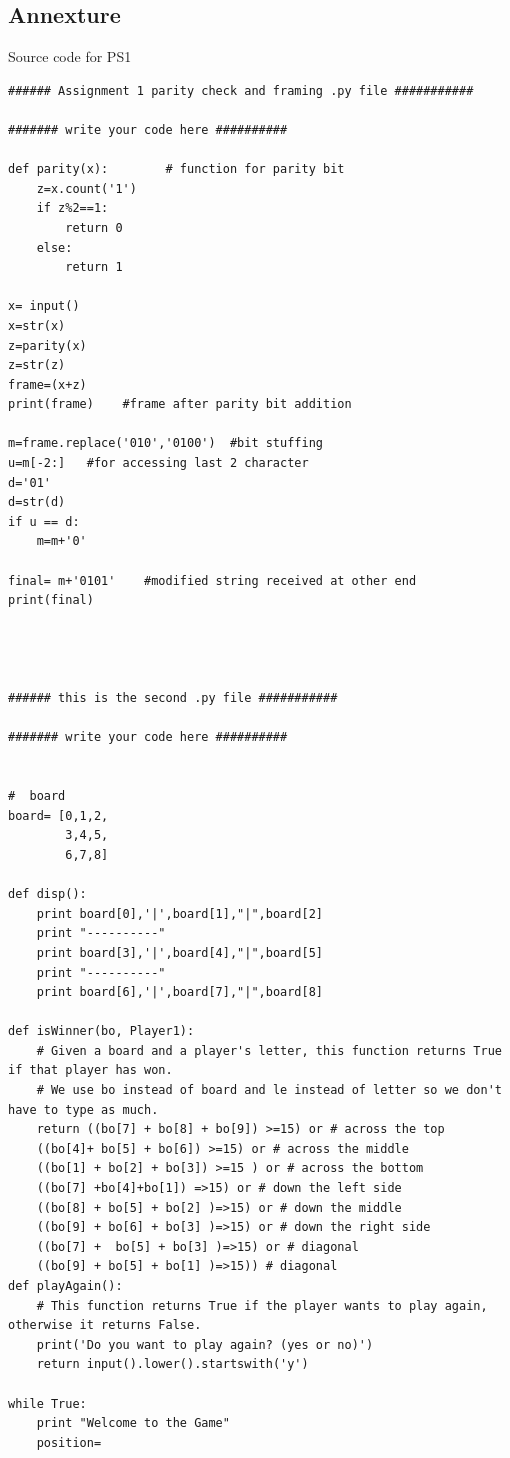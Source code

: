\documentclass[12pt]{article}
\begin{document}
\subsection* {Annexture}
Source code for PS1
\begin{lstlisting}
###### Assignment 1 parity check and framing .py file ###########

####### write your code here ##########

def parity(x):        # function for parity bit
	z=x.count('1')
	if z%2==1:
		return 0
	else:
		return 1

x= input()
x=str(x)
z=parity(x)
z=str(z)
frame=(x+z)
print(frame)    #frame after parity bit addition

m=frame.replace('010','0100')  #bit stuffing
u=m[-2:]   #for accessing last 2 character
d='01'
d=str(d)
if u == d:
	m=m+'0'

final= m+'0101'    #modified string received at other end  
print(final)

	


###### this is the second .py file ###########

####### write your code here ##########


#  board
board= [0,1,2,
        3,4,5,
        6,7,8]

def disp():
	print board[0],'|',board[1],"|",board[2]
	print "----------"
	print board[3],'|',board[4],"|",board[5]
	print "----------"
	print board[6],'|',board[7],"|",board[8]

def isWinner(bo, Player1):
    # Given a board and a player's letter, this function returns True if that player has won.
    # We use bo instead of board and le instead of letter so we don't have to type as much.
    return ((bo[7] + bo[8] + bo[9]) >=15) or # across the top
    ((bo[4]+ bo[5] + bo[6]) >=15) or # across the middle
    ((bo[1] + bo[2] + bo[3]) >=15 ) or # across the bottom
    ((bo[7] +bo[4]+bo[1]) =>15) or # down the left side
    ((bo[8] + bo[5] + bo[2] )=>15) or # down the middle
    ((bo[9] + bo[6] + bo[3] )=>15) or # down the right side
    ((bo[7] +  bo[5] + bo[3] )=>15) or # diagonal
    ((bo[9] + bo[5] + bo[1] )=>15)) # diagonal
def playAgain():
    # This function returns True if the player wants to play again, otherwise it returns False.
    print('Do you want to play again? (yes or no)')
    return input().lower().startswith('y')

while True:
	print "Welcome to the Game"
	position= 

\end{lstlisting}
\end{document}
